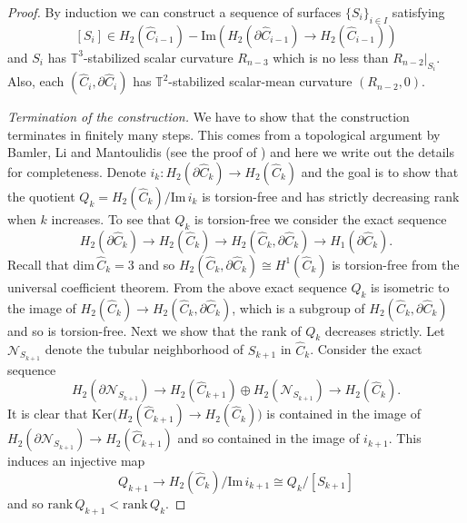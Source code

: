 \documentclass[11pt,letterpaper]{amsart}
\numberwithin{equation}{section}
\theoremstyle{definition}
\begin{document}
\begin{proof}
By induction we can construct a sequence of surfaces $\{S_i\}_{i\in I}$ satisfying
$$[S_i]\in H_2(\hat C_{i-1})-\mathrm{Im}\left(H_2(\partial \hat C_{i-1})\to H_2(\hat C_{i-1})\right)$$
and $S_i$ has $\mathbb T^3$-stabilized scalar curvature $R_{n-3}$ which is no less than $R_{n-2}|_{S_i}$. Also, each $(\hat C_i,\partial\hat C_i)$ has $\mathbb{T}^{2}$-stabilized scalar-mean curvature $(R_{n-2},0)$.

\medskip

{\it Termination of the construction.} We have to show that the construction terminates in finitely many steps. This comes from a topological argument by Bamler, Li and Mantoulidis (see the proof of \cite[Lemma 2.5]{BLM22}) and here we write out the details for completeness. Denote $i_k:H_2(\partial\hat C_k)\to H_2(\hat C_k)$ and the goal is to show that the quotient $Q_k=H_{2}(\hat C_k)/\mathrm{Im}\,i_k$ is torsion-free and has strictly decreasing rank when $k$ increases. To see that $Q_k$ is torsion-free we consider the exact sequence
$$
H_2(\partial \hat C_k)\to H_2(\hat C_k)\to H_2(\hat C_k,\partial\hat C_k)\to H_1(\partial\hat C_k).
$$
Recall that $\mathrm{dim}\,\hat C_k=3$ and so $H_2(\hat C_k,\partial\hat C_k)\cong H^1(\hat C_k)$ is torsion-free from the universal coefficient theorem. From the above exact sequence $Q_k$ is isometric to the image of $H_2(\hat C_k)\to H_2(\hat C_k,\partial\hat C_k)$, which is a subgroup of $H_2(\hat C_k,\partial\hat C_k)$ and so is torsion-free. Next we show that the rank of $Q_k$ decreases strictly. Let $\mathcal N_{S_{k+1}}$ denote the tubular neighborhood of $S_{k+1}$ in $\hat C_k$. Consider the exact sequence
$$
H_2(\partial\mathcal N_{S_{k+1}})\to H_2(\hat C_{k+1})\oplus H_2(\mathcal N_{S_{k+1}})\to H_2(\hat C_{k}).
$$
It is clear that $\mathrm{Ker}\big(H_2(\hat C_{k+1})\to H_2(\hat C_k)\big)$ is contained in the image of $H_2(\partial\mathcal N_{S_{k+1}})\to H_2(\hat C_{k+1})$ and so contained in the image of $i_{k+1}$. This induces an injective map
$$
Q_{k+1}\to H_2(\hat C_k)/\mathrm{ Im }\,i_{k+1}\cong Q_k/[S_{k+1}]
$$
and so $\mathrm{rank}\, Q_{k+1}<\mathrm{rank}\, Q_k$.


\end{proof}
\end{document}
